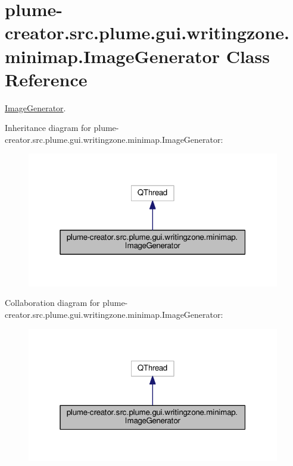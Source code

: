 \hypertarget{classplume-creator_1_1src_1_1plume_1_1gui_1_1writingzone_1_1minimap_1_1_image_generator}{}\section{plume-\/creator.src.\+plume.\+gui.\+writingzone.\+minimap.\+Image\+Generator Class Reference}
\label{classplume-creator_1_1src_1_1plume_1_1gui_1_1writingzone_1_1minimap_1_1_image_generator}


\hyperlink{classplume-creator_1_1src_1_1plume_1_1gui_1_1writingzone_1_1minimap_1_1_image_generator}{Image\+Generator}.  




Inheritance diagram for plume-\/creator.src.\+plume.\+gui.\+writingzone.\+minimap.\+Image\+Generator\+:\nopagebreak
\begin{figure}[H]
\begin{center}
\leavevmode
\includegraphics[width=313pt]{classplume-creator_1_1src_1_1plume_1_1gui_1_1writingzone_1_1minimap_1_1_image_generator__inherit__graph}
\end{center}
\end{figure}


Collaboration diagram for plume-\/creator.src.\+plume.\+gui.\+writingzone.\+minimap.\+Image\+Generator\+:\nopagebreak
\begin{figure}[H]
\begin{center}
\leavevmode
\includegraphics[width=313pt]{classplume-creator_1_1src_1_1plume_1_1gui_1_1writingzone_1_1minimap_1_1_image_generator__coll__graph}
\end{center}
\end{figure}
